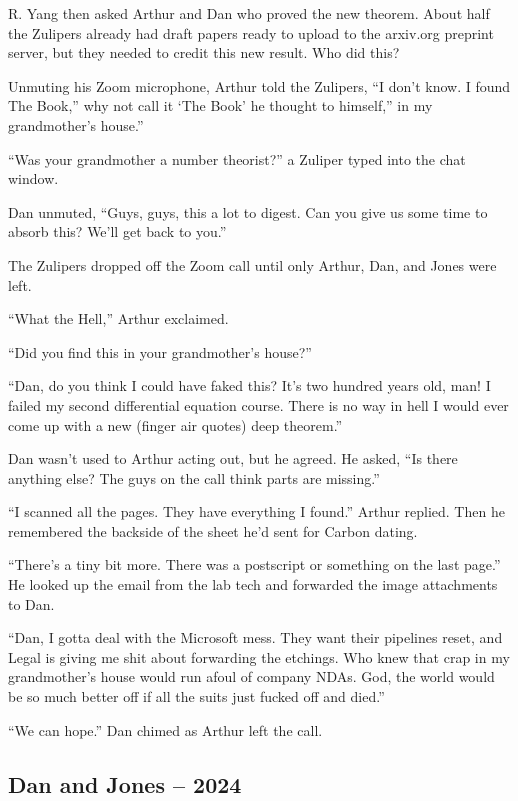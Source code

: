 R. Yang then asked Arthur and Dan who proved the new theorem. About half
the Zulipers already had draft papers ready to upload to the arxiv.org
preprint server, but they needed to credit this new result. Who did
this?

Unmuting his Zoom microphone, Arthur told the Zulipers, ``I don't know.
I found The Book,'' why not call it `The Book' he thought to himself,''
in my grandmother's house.''

``Was your grandmother a number theorist?'' a Zuliper typed into the
chat window.

Dan unmuted, ``Guys, guys, this a lot to digest. Can you give us some
time to absorb this? We'll get back to you.''

The Zulipers dropped off the Zoom call until only Arthur, Dan, and Jones
were left.

``What the Hell,'' Arthur exclaimed.

``Did you find this in your grandmother's house?''

``Dan, do you think I could have faked this? It's two hundred years old,
man! I failed my second differential equation course. There is no way in
hell I would ever come up with a new (finger air quotes) deep theorem.''

Dan wasn't used to Arthur acting out, but he agreed. He asked, ``Is
there anything else? The guys on the call think parts are missing.''

``I scanned all the pages. They have everything I found.'' Arthur
replied. Then he remembered the backside of the sheet he'd sent for
Carbon dating.

``There's a tiny bit more. There was a postscript or something on the
last page.'' He looked up the email from the lab tech and forwarded the
image attachments to Dan.

``Dan, I gotta deal with the Microsoft mess. They want their pipelines
reset, and Legal is giving me shit about forwarding the etchings. Who
knew that crap in my grandmother's house would run afoul of company
NDAs. God, the world would be so much better off if all the suits just
fucked off and died.''

``We can hope.'' Dan chimed as Arthur left the call.

\hypertarget{dan-and-jones-2024}{%
\subsection*{Dan and Jones -- 2024}\label{dan-and-jones-2024}}

